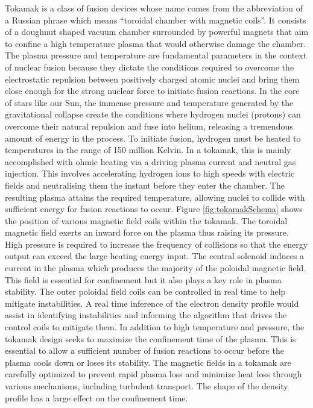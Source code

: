 Tokamak is a class of fusion devices whose name comes from the abbreviation of a Russian phrase which means ``toroidal chamber with magnetic coils''. It consists of a doughnut shaped vacuum chamber surrounded by powerful magnets that aim to confine a high temperature plasma that would otherwise damage the chamber. The plasma pressure and temperature are fundamental parameters in the context of nuclear fusion because they dictate the conditions required to overcome the electrostatic repulsion between positively charged atomic nuclei and bring them close enough for the strong nuclear force to initiate fusion reactions. In the core of stars like our Sun, the immense pressure and temperature generated by the gravitational collapse create the conditions where hydrogen nuclei (protons) can overcome their natural repulsion and fuse into helium, releasing a tremendous amount of energy in the process. To initiate fusion, hydrogen must be heated to temperatures in the range of 150 million Kelvin. In a tokamak, this is mainly accomplished with ohmic heating via a driving plasma current and neutral gas injection. This involves accelerating hydrogen ions to high speeds with electric fields and neutralising them the instant before they enter the chamber. The resulting plasma attains the required temperature, allowing nuclei to collide with sufficient energy for fusion reactions to occur. Figure \ref{fig:tokamakSchema} shows the position of various magnetic field coils within the tokamak. The toroidal magnetic field exerts an inward force on the plasma thus raising its pressure. High pressure is required to increase the frequency of collisions so that the energy output can exceed the large heating energy input. The central solenoid induces a current in the plasma which produces the majority of the poloidal magnetic field. This field is essential for confinement but it also plays a key role in plasma stability. The outer poloidal field coils can be controlled in real time to help mitigate instabilities. A real time inference of the electron density profile would assist in identifying instabilities and informing the algorithm that drives the control coils to mitigate them. In addition to high temperature and pressure, the tokamak design seeks to maximize the confinement time of the plasma. This is essential to allow a sufficient number of fusion reactions to occur before the plasma cools down or loses its stability. The magnetic fields in a tokamak are carefully optimized to prevent rapid plasma loss and minimize heat loss through various mechanisms, including turbulent transport. The shape of the density profile has a large effect on the confinement time.

